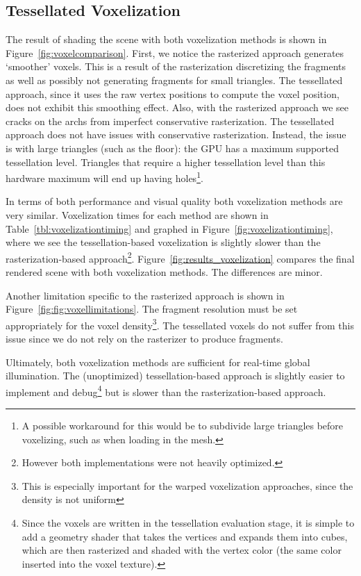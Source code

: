 \subsection{Tessellated Voxelization}
The result of shading the scene with both voxelization methods is shown in Figure~\ref{fig:voxelcomparison}. First, we notice the rasterized approach generates `smoother' voxels. This is a result of the rasterization discretizing the fragments as well as possibly not generating fragments for small triangles. The tessellated approach, since it uses the raw vertex positions to compute the voxel position, does not exhibit this smoothing effect. Also, with the rasterized approach we see cracks on the archs from imperfect conservative rasterization. The tessellated approach does not have issues with conservative rasterization. Instead, the issue is with large triangles (such as the floor): the GPU has a maximum supported tessellation level. Triangles that require a higher tessellation level than this hardware maximum will end up having holes\footnote{A possible workaround for this would be to subdivide large triangles before voxelizing, such as when loading in the mesh.}.

In terms of both performance and visual quality both voxelization methods are very similar. Voxelization times for each method are shown in Table~\ref{tbl:voxelizationtiming} and graphed in Figure~\ref{fig:voxelizationtiming}, where we see the tessellation-based voxelization is slightly slower than the rasterization-based approach\footnote{However both implementations were not heavily optimized.}. Figure~\ref{fig:results_voxelization} compares the final rendered scene with both voxelization methods. The differences are minor.

Another limitation specific to the rasterized approach is shown in Figure~\ref{fig:fig:voxellimitations}. The fragment resolution must be set appropriately for the voxel density\footnote{This is especially important for the warped voxelization approaches, since the density is not uniform}. The tessellated voxels do not suffer from this issue since we do not rely on the rasterizer to produce fragments.

Ultimately, both voxelization methods are sufficient for real-time global illumination. The (unoptimized) tessellation-based approach is slightly easier to implement and debug\footnote{Since the voxels are written in the tessellation evaluation stage, it is simple to add a geometry shader that takes the vertices and expands them into cubes, which are then rasterized and shaded with the vertex color (the same color inserted into the voxel texture).} but is slower than the rasterization-based approach. %

